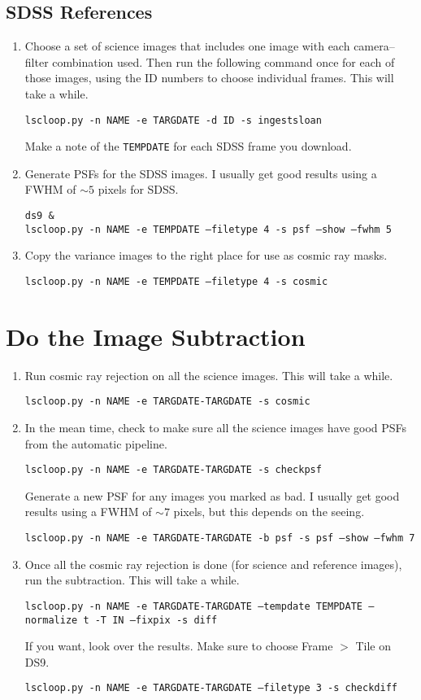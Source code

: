 \subsection{SDSS References}
\begin{enumerate}

\item Choose a set of science images that includes one image with each camera--filter combination used. Then run the following command once for each of those images, using the ID numbers to choose individual frames. This will take a while.

{\tt lscloop.py -n NAME -e TARGDATE -d ID -s ingestsloan }

Make a note of the {\tt TEMPDATE} for each SDSS frame you download.

\item Generate PSFs for the SDSS images. I usually get good results using a FWHM of $\sim 5$ pixels for SDSS.

{\tt ds9 \& } \\
{\tt lscloop.py -n NAME -e TEMPDATE --filetype 4 -s psf --show --fwhm 5 }

\item Copy the variance images to the right place for use as cosmic ray masks.

{\tt lscloop.py -n NAME -e TEMPDATE --filetype 4 -s cosmic }

\end{enumerate}

\section{Do the Image Subtraction}

\begin{enumerate}
\item Run cosmic ray rejection on all the science images. This will take a while.

{\tt lscloop.py -n NAME -e TARGDATE-TARGDATE -s cosmic}

\item In the mean time, check to make sure all the science images have good PSFs from the automatic pipeline.

{\tt lscloop.py -n NAME -e TARGDATE-TARGDATE -s checkpsf}

Generate a new PSF for any images you marked as bad. I usually get good results using a FWHM of $\sim 7$ pixels, but this depends on the seeing.

{\tt lscloop.py -n NAME -e TARGDATE-TARGDATE -b psf -s psf --show --fwhm 7}

\item Once all the cosmic ray rejection is done (for science and reference images), run the subtraction. This will take a while.

{\tt lscloop.py -n NAME -e TARGDATE-TARGDATE --tempdate TEMPDATE --normalize t -T IN --fixpix -s diff}

If you want, look over the results. Make sure to choose Frame $>$ Tile on DS9.

{\tt lscloop.py -n NAME -e TARGDATE-TARGDATE --filetype 3 -s checkdiff}
\end{enumerate}

